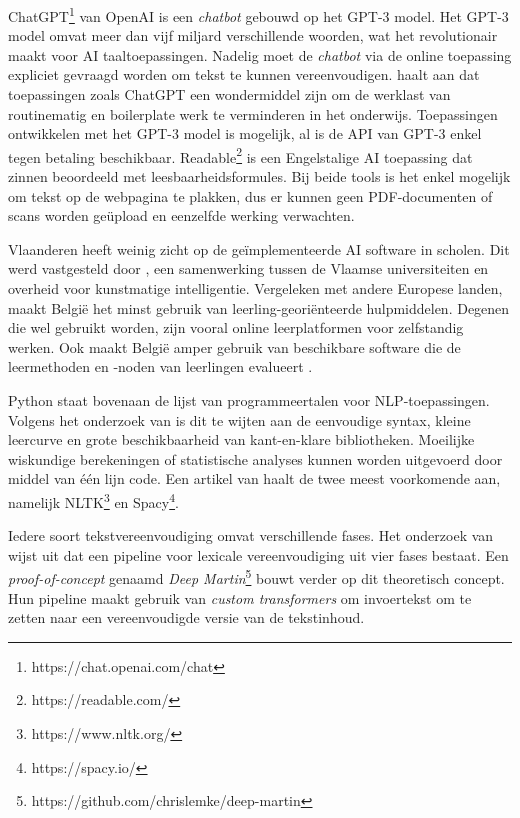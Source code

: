 ChatGPT\footnote{https://chat.openai.com/chat} van OpenAI is een \textit{chatbot} gebouwd op het GPT-3 model. Het GPT-3 model omvat meer dan vijf miljard verschillende woorden, wat het revolutionair maakt voor AI taaltoepassingen. Nadelig moet de \textit{chatbot} via de online toepassing expliciet gevraagd worden om tekst te kunnen vereenvoudigen. \textcite{Verhoeven2023} haalt aan dat toepassingen zoals ChatGPT een wondermiddel zijn om de werklast van routinematig en boilerplate werk te verminderen in het onderwijs. Toepassingen ontwikkelen met het GPT-3 model is mogelijk, al is de API van GPT-3 enkel tegen betaling beschikbaar. Readable\footnote{https://readable.com/} is een Engelstalige AI toepassing dat zinnen beoordeeld met leesbaarheidsformules. Bij beide tools is het enkel mogelijk om tekst op de webpagina te plakken, dus er kunnen geen PDF-documenten of scans worden geüpload en eenzelfde werking verwachten.

Vlaanderen heeft weinig zicht op de geïmplementeerde AI software in scholen. Dit werd vastgesteld door \autocite{Martens2021}, een samenwerking tussen de Vlaamse universiteiten en overheid voor kunstmatige intelligentie. Vergeleken met andere Europese landen, maakt België het minst gebruik van leerling-georiënteerde hulpmiddelen. Degenen die wel gebruikt worden, zijn vooral online leerplatformen voor zelfstandig werken. Ook maakt België amper gebruik van beschikbare software die de leermethoden en -noden van leerlingen evalueert \autocite{Martens2021a}. 

Python staat bovenaan de lijst van programmeertalen voor NLP-toepassingen. Volgens het onderzoek van \textcite{Thangarajah2019} is dit te wijten aan de eenvoudige syntax, kleine leercurve en grote beschikbaarheid van kant-en-klare bibliotheken. Moeilijke wiskundige berekeningen of statistische analyses kunnen worden uitgevoerd door middel van één lijn code. Een artikel van \textcite{Malik2022} haalt de twee meest voorkomende aan, namelijk NLTK\footnote{https://www.nltk.org/} en Spacy\footnote{https://spacy.io/}.

Iedere soort tekstvereenvoudiging omvat verschillende fases. Het onderzoek van \textcite{Shardlow2014} wijst uit dat een pipeline voor lexicale vereenvoudiging uit vier fases bestaat. Een \textit{proof-of-concept} genaamd \textit{Deep Martin}\footnote{https://github.com/chrislemke/deep-martin} bouwt verder op dit theoretisch concept. Hun pipeline maakt gebruik van \textit{custom transformers} om invoertekst om te zetten naar een vereenvoudigde versie van de tekstinhoud.

